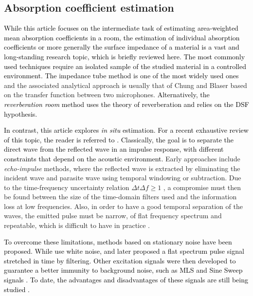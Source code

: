 \documentclass[reprint]{JASA}
\begin{document}
\subsection{Absorption coefficient estimation}
\label{subsec:related_acoustic}
\textcolor{black}{While this article focuses on the intermediate task of estimating area-weighted mean absorption coefficients in a room, the estimation of individual absorption coefficients or more generally the surface impedance of a material is a vast and long-standing research topic, which is briefly reviewed here}.
%
\textcolor{black}{The most commonly used techniques require an isolated sample of the studied material in a controlled environment. The impedance tube method is one of the most widely used ones \cite{ISO10534,ASTME1050}} and the associated analytical approach is usually that of Chung and Blaser \cite{Chung1980a,Chung1980b} based on the transfer function between two microphones. \textcolor{black}{Alternatively, the \textit{reverberation room} method \cite{ISO354} uses the theory of reverberation and relies on the DSF hypothesis.}

\textcolor{black}{In contrast, this article explores \textit{in situ} estimation. For a recent exhaustive review of this topic, the reader is referred to \cite{Brandao2015l}. Classically, the goal is to separate the direct wave from the reflected wave in an impulse response, with different constraints that depend on the acoustic environment.} Early approaches include \textit{echo-impulse} methods, where the reflected wave is extracted by eliminating the incident wave and parasite wave using temporal windowing or subtraction. Due to the time-frequency uncertainty relation $\Delta t \Delta f \geq 1$ \cite{Garai1993}, a compromise must then be found between the size of the time-domain filters used and the information loss at low frequencies. Also, in order to have a good temporal separation of the waves, the emitted pulse must be narrow, of flat frequency spectrum and repeatable, which is difficult to have in practice \cite{Yuzawa1975,Davies1979,Cramond1984,Garai1993}.

\textcolor{black}{To overcome these limitations, methods based on stationary noise have been proposed. While \cite{Barry1974,Hollin1977l} use white noise, \cite{Aoshima1981} and \cite{Suzuki1995} later proposed a flat spectrum pulse signal stretched in time by filtering. Other excitation signals were then developed to guarantee a better immunity to background noise, such as MLS \cite{Schroeder1979,Rife1989,Stan2002} and Sine Sweep signals \cite{Muller2001,farina2000,farina2007advancements}. To date, the advantages and disadvantages of these signals are still being studied \cite{Torras2010,Guidorzia2015}.}
\end{document}
